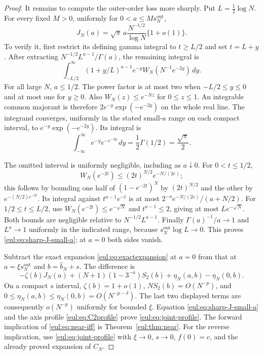 \begin{proof}
It remains to compute the outer-order loss more sharply. Put
$L=\tfrac12\log N$. For every fixed $M>0$, uniformly for
$0<a\leq M s_N^{\mathrm{out}}$,
\begin{equation}\label{eul:eq:sharp-J-small-a}
 J_N(a)=\sqrt\pi\,a\frac{N^{-1/2}}{\log N}\{1+o(1)\}.
\end{equation}
To verify it, first restrict its defining gamma integral to $t\geq L/2$
and set $t=L+y$. After extracting $N^{-1/2}L^{a-1}/\Gamma(a)$,
the remaining integral is
\[
 \int_{-L/2}^{\infty}(1+y/L)^{a-1}e^{-y}
       W_N(N^{-1}e^{-2y})\,dy.
\]
For all large $N$, $a\leq1/2$. The power factor is at most two
when $-L/2\leq y\leq0$ and at most one for $y\geq0$.
Also $W_N(z)\leq e^{-Nz}$ for $0\leq z\leq1$.
An integrable common majorant is therefore
$2e^{-y}\exp(-e^{-2y})$ on the whole real line.
The integrand converges, uniformly in the stated small-$a$ range
on each compact interval, to $e^{-y}\exp(-e^{-2y})$.
Its integral is
\[
 \int_{-\infty}^{\infty}e^{-y}e^{-e^{-2y}}\,dy
       =\frac12\Gamma(1/2)=\frac{\sqrt\pi}{2}.
\]

The omitted interval is uniformly negligible, including as $a\downarrow0$.
For $0<t\leq1/2$,
\[
 W_N(e^{-2t})\leq(2t)^{N/2}e^{-N/(2e)};
\]
this follows by bounding one half of $(1-e^{-2t})^N$ by $(2t)^{N/2}$
and the other by $e^{-(N/2)e^{-2t}}$.
Its integral against $t^{a-1}e^{-t}$ is at most
$2^{-a}e^{-N/(2e)}/(a+N/2)$.
For $1/2\leq t\leq L/2$, use
$W_N(e^{-2t})\leq e^{-\sqrt N}$ and $t^{a-1}\leq2$,
giving at most $L e^{-\sqrt N}$.
Both bounds are negligible relative to $N^{-1/2}L^{a-1}$.
Finally $\Gamma(a)^{-1}/a\to1$ and
$L^a\to1$ uniformly in the indicated range, because
$s_N^{\mathrm{out}}\log L\to0$. This proves
\eqref{eul:eq:sharp-J-small-a}; at $a=0$ both sides vanish.

Subtract the exact expansion \eqref{eul:eq:exactexpansion} at $a=0$
from that at $a=\xi s_N^{\mathrm{out}}$ and
$b=\widehat b_N+s$. The difference is
\[
 -\zeta(b)J_N(a)
 +(N+1)(1-3^{-a})S_2(b)+\eta_N(a,b)-\eta_N(0,b).
\]
On a compact $s$ interval, $\zeta(b)=1+o(1)$,
$NS_2(b)=O(N^{-p})$, and
$0\leq\eta_N(a,b)\leq\eta_N(0,b)=O(N^{-p-\delta})$.
The last two displayed terms are consequently $o(N^{-p})$
uniformly for bounded $\xi$. Equation \eqref{eul:eq:sharp-J-small-a}
and the axis profile \eqref{eul:eq:C2profile} prove
\eqref{eul:eq:joint-profile}.
The forward implication of \eqref{eul:eq:near-iff} is
Theorem~\ref{eul:thm:near}. For the reverse implication, use
\eqref{eul:eq:joint-profile} with $\xi\to0$, $s\to0$,
$f(0)=c$, and the already proved expansion of $C_N$.
\end{proof}
